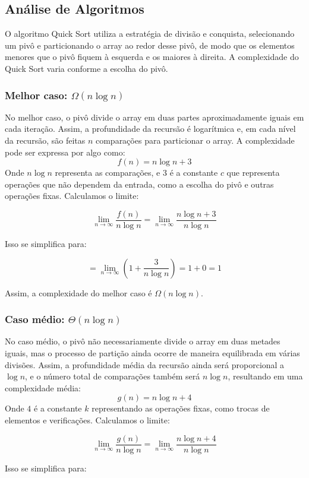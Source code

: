 \subsection{Análise de Algoritmos}

O algoritmo Quick Sort utiliza a estratégia de divisão e conquista, selecionando um pivô e particionando o array ao redor desse pivô, de modo que os elementos menores que o pivô fiquem à esquerda e os maiores à direita. A complexidade do Quick Sort varia conforme a escolha do pivô.
\subsubsection{Melhor caso: \(\Omega(n \log n)\)}
No melhor caso, o pivô divide o array em duas partes aproximadamente iguais em cada iteração. Assim, a profundidade da recursão é logarítmica e, em cada nível da recursão, são feitas \(n\) comparações para particionar o array. A complexidade pode ser expressa por algo como:
\[
f(n) = n \log n + 3
\]
Onde \(n \log n\) representa as comparações, e \(3\) é a constante \(c\) que representa operações que não dependem da entrada, como a escolha do pivô e outras operações fixas. Calculamos o limite:

\[
\lim_{n \to \infty} \frac{f(n)}{n \log n} = \lim_{n \to \infty} \frac{n \log n + 3}{n \log n}
\]

Isso se simplifica para:

\[
= \lim_{n \to \infty} \left(1 + \frac{3}{n \log n}\right) = 1 + 0 = 1
\]

Assim, a complexidade do melhor caso é \(\Omega(n \log n)\).

\subsubsection{Caso médio: \(\Theta(n \log n)\)}
No caso médio, o pivô não necessariamente divide o array em duas metades iguais, mas o processo de partição ainda ocorre de maneira equilibrada em várias divisões. Assim, a profundidade média da recursão ainda será proporcional a \( \log n \), e o número total de comparações também será \(n \log n\), resultando em uma complexidade média:
\[
g(n) = n \log n + 4
\]
Onde \(4\) é a constante \(k\) representando as operações fixas, como trocas de elementos e verificações. Calculamos o limite:

\[
\lim_{n \to \infty} \frac{g(n)}{n \log n} = \lim_{n \to \infty} \frac{n \log n + 4}{n \log n}
\]

Isso se simplifica para:

